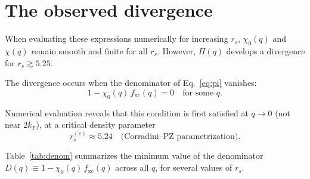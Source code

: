\documentclass[aps,prb,twocolumn,superscriptaddress,floatfix]{revtex4-2}
\begin{document}
\section{The observed divergence}

When evaluating these expressions numerically for increasing $r_s$,
$\chi_0(q)$ and $\chi(q)$ remain smooth and finite for all $r_s$.
However, $\Pi(q)$ develops a divergence for $r_s \gtrsim 5.25$.

The divergence occurs when the denominator of Eq.~\eqref{eq:pi} vanishes:
\begin{equation}
    1 - \chi_0(q)\, f_{\mathrm{xc}}(q) = 0
    \quad\text{for some }q.
    \label{eq:instability}
\end{equation}

Numerical evaluation reveals that this condition is first satisfied at
$q \to 0$ (not near $2k_F$), at a critical density parameter
\begin{equation}
    \boxed{r_s^{(c)} \approx 5.24}
    \quad\text{(Corradini--PZ parametrization).}
    \label{eq:rsc}
\end{equation}

Table~\ref{tab:denom} summarizes the minimum value of the denominator
$D(q) \equiv 1 - \chi_0(q)\,f_{\mathrm{xc}}(q)$ across all $q$, for
several values of $r_s$.
\end{document}

